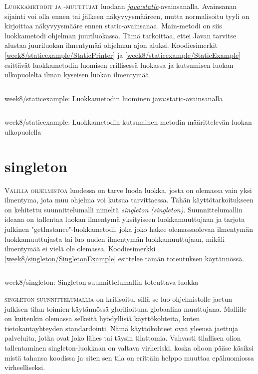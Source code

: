 \documentclass[openany]{book}
\newcommand{\newthought}[1]{\smallskip\textsc{#1}}
\newcommand{\eng}[1]{\textit{(#1)}}
\newcommand{\new}[1]{\textit{\gls{#1}}}
\newcommand{\neweng}[2]{\new{#1} \eng{#2}}
\newcommand{\java}[1]{\underline{\gls{java:#1}}}
\newcommand{\newjava}[1]{\textit{\java{#1}}}
\newcommand{\code}[3]{
	\begin{listing}
		\linespread{0.85}
		\inputminted{java}{OhjelmointiopasEsimerkit/src/#1/#2.java}
		\caption{#1: #3}
		\label{#1/#2}
	\end{listing}
}
\begin{document}
\newthought{Luokkametodit ja -muuttujat} luodaan \newjava{static}-avainsanalla. Avainsanan
sijainti voi olla ennen tai jälkeen näkyvyysmääreen, mutta normalisoitu tyyli on kirjoittaa
näkyvyysmääre ennen static-avainsanaa. Main-metodi on siis luokkametodi ohjelman juuriluokassa.
Tämä tarkoittaa, ettei Javan tarvitse alustaa juuriluokan ilmentymää ohjelman ajon aluksi.
Koodiesimerkit \ref{week8/staticexample/StaticPrinter} ja \ref{week8/staticexample/StaticExample}
esittävät luokkametodin luomisen erillisessä luokassa ja kutsumisen luokan ulkopuolelta ilman
kyseisen luokan ilmentymää.

\code{week8/staticexample}{StaticPrinter}{Luokkametodin luominen \java{static}-avainsanalla}
\code{week8/staticexample}{StaticExample}{Luokkametodin kutsuminen metodin määrittelevän luokan
ulkopuolella}

\section{singleton}
\label{singleton}

\newthought{Välillä ohjelmistoa} luodessa on tarve luoda luokka, josta on olemassa vain yksi
\gls{ilmentyma}, jota muu ohjelma voi kutsua tarvittaessa. Tähän käyttötarkoitukseen on kehitettu
suunnittelumalli nimeltä \neweng{singleton}{singleton}. Suunnittelumallin ideana on tallentaa
luokan ilmentymä yksityiseen luokkamuuttujaan ja tarjota julkinen "getInstance"-luokkametodi,
joka joko hakee olemassaolevan ilmentymän luokkamuuttujasta tai luo uuden ilmentymän
luokkamuuttujaan, mikäli ilmentymää ei vielä ole olemassa. Koodiesimerkki
\ref{week8/singleton/SingletonExample} esittelee tämän toteutuksen käytännössä.

\code{week8/singleton}{SingletonExample}{Singleton-suunnittelumallin toteuttava luokka}

\newthought{\Gls{singleton}-suunnittelumallia} on kritisoitu, sillä se luo ohjelmistolle jaetun
julkisen tilan toimien käytännössä glorifioituna globaalina muuttujana. Mallille on kuitenkin
olemassa selkeitä hyödyllisiä käyttökohteita, kuten tietokantayhteyden standardointi. Nämä
käyttökohteet ovat yleensä jaettuja palveluita, jotka ovat joko lähes tai täysin tilattomia.
Vahvasti tilallisen olion tallentaminen singleton-luokkaan on valtava virheriski, koska olioon
pääse käsiksi mistä tahansa koodissa ja siten sen tila on erittäin helppo muuttaa epähuomiossa
virheelliseksi.

\end{document}
